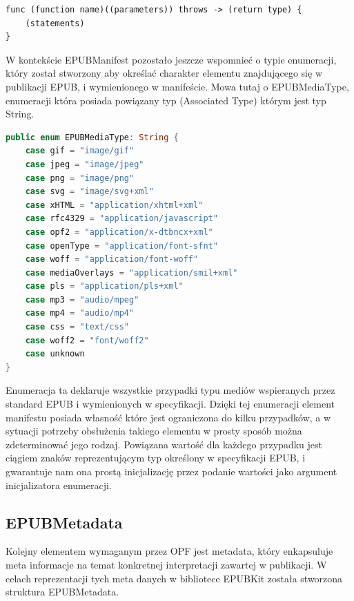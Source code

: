 \begin{lstlisting}[caption={Funkcje i metody które mogą rzucać błędy, przy deklaracji muszą zostać oznaczone słowem kluczowym "throws"\cite{theSwiftProgrammingLanguageDeclarations}.},language=swift-reference]
func (function name)((parameters)) throws -> (return type) {
    (statements)
}
\end{lstlisting}

W kontekście EPUBManifest pozostało jeszcze wspomnieć o typie enumeracji, który został stworzony aby określać charakter elementu znajdującego się w publikacji EPUB, i wymienionego w manifeście. Mowa tutaj o EPUBMediaType, enumeracji która posiada powiązany typ (Associated Type) którym jest typ String.

\begin{lstlisting}[caption={Enumeracja EPUBMediaType.}, language=swift]
public enum EPUBMediaType: String {
    case gif = "image/gif"
    case jpeg = "image/jpeg"
    case png = "image/png"
    case svg = "image/svg+xml"
    case xHTML = "application/xhtml+xml"
    case rfc4329 = "application/javascript"
    case opf2 = "application/x-dtbncx+xml"
    case openType = "application/font-sfnt"
    case woff = "application/font-woff"
    case mediaOverlays = "application/smil+xml"
    case pls = "application/pls+xml"
    case mp3 = "audio/mpeg"
    case mp4 = "audio/mp4"
    case css = "text/css"
    case woff2 = "font/woff2"
    case unknown
}
\end{lstlisting}

Enumeracja ta deklaruje wszystkie przypadki typu mediów wspieranych przez standard EPUB i wymienionych w specyfikacji. Dzięki tej enumeracji element manifestu posiada własność które jest ograniczona do kilku przypadków, a w sytuacji potrzeby obsłużenia takiego elementu w prosty sposób można zdeterminować jego rodzaj. Powiązana wartość dla każdego przypadku jest ciągiem znaków reprezentującym typ określony w specyfikacji EPUB, i gwarantuje nam ona prostą inicjalizację przez podanie wartości jako argument inicjalizatora enumeracji.

\subsection{EPUBMetadata}

Kolejny elementem wymaganym przez OPF jest metadata, który enkapsuluje meta informacje na temat konkretnej interpretacji zawartej w publikacji. W celach reprezentacji tych meta danych w bibliotece EPUBKit została stworzona struktura EPUBMetadata.

